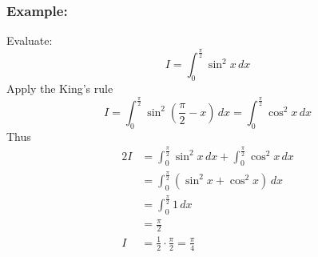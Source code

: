 \documentclass[11pt]{article}
\begin{document}
\subsubsection*{Example:}
Evaluate:
\[
    I=\int_0^{\frac{\pi}{2}} \sin^2 x \,dx
\]
Apply the King's rule
\[
    I=\int_0^{\frac{\pi}{2}}\sin^2(\frac{\pi}{2}-x)\,dx=\int_0^{\frac{\pi}{2}}\cos^2 x\,dx
\]
Thus
\[
    \begin{aligned}
        2I&=\int_0^{\frac{\pi}{2}} \sin^2 x \,dx+\int_0^{\frac{\pi}{2}}\cos^2 x\,dx\\[.5em]
        &=\int_0^{\frac{\pi}{2}}\left(\sin^2 x + \cos^2 x\right)\,dx\\[.5em]
        &=\int_0^{\frac{\pi}{2}}1\,dx\\[.5em]
        &=\frac{\pi}{2}\\[.5em]
        I&=\frac{1}{2}\cdot\frac{\pi}{2}=\frac{\pi}{4}
    \end{aligned}
\]
\end{document}
